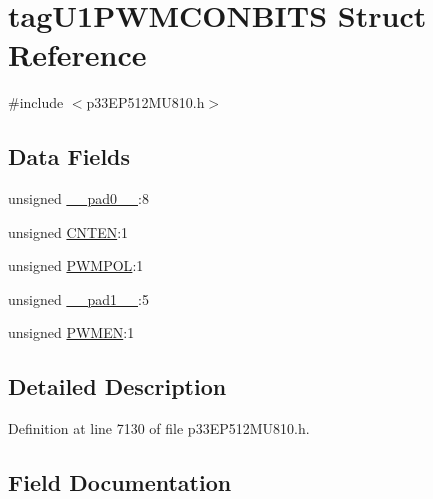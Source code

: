 \hypertarget{structtag_u1_p_w_m_c_o_n_b_i_t_s}{}\section{tag\+U1\+P\+W\+M\+C\+O\+N\+B\+I\+TS Struct Reference}
\label{structtag_u1_p_w_m_c_o_n_b_i_t_s}


{\ttfamily \#include $<$p33\+E\+P512\+M\+U810.\+h$>$}

\subsection*{Data Fields}
\begin{DoxyCompactItemize}
\item 
unsigned \hyperlink{structtag_u1_p_w_m_c_o_n_b_i_t_s_adf71f3d8410c1f1dbbc96680a92c49af}{\+\_\+\+\_\+pad0\+\_\+\+\_\+}\+:8
\item 
unsigned \hyperlink{structtag_u1_p_w_m_c_o_n_b_i_t_s_a78a6ce3e13714571b117ec78c82ec986}{C\+N\+T\+EN}\+:1
\item 
unsigned \hyperlink{structtag_u1_p_w_m_c_o_n_b_i_t_s_aa9e45e31f22290a2256cb65910dc9f19}{P\+W\+M\+P\+OL}\+:1
\item 
unsigned \hyperlink{structtag_u1_p_w_m_c_o_n_b_i_t_s_acaf2d0924a107ec6e8d2e31febaf66f9}{\+\_\+\+\_\+pad1\+\_\+\+\_\+}\+:5
\item 
unsigned \hyperlink{structtag_u1_p_w_m_c_o_n_b_i_t_s_a55523a5b3feae1cf53565e7c13efb17b}{P\+W\+M\+EN}\+:1
\end{DoxyCompactItemize}


\subsection{Detailed Description}


Definition at line 7130 of file p33\+E\+P512\+M\+U810.\+h.



\subsection{Field Documentation}
\mbox{\label{structtag_u1_p_w_m_c_o_n_b_i_t_s_adf71f3d8410c1f1dbbc96680a92c49af}} 
